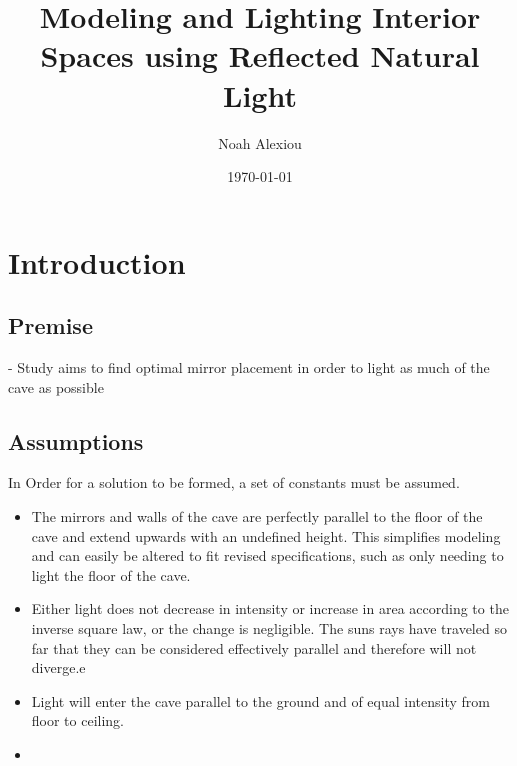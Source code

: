 \documentclass[11pt, letterpaper]{article}
\begin{document}
\title{Modeling and Lighting Interior Spaces using Reflected Natural Light}
\author{Noah Alexiou}
\date{\today}
\maketitle
\newpage
\tableofcontents
\newpage


\section{Introduction}


\subsection{Premise}
- Study aims to find optimal mirror placement in order to light as much of the cave as possible




\subsection{Assumptions}
\par
In Order for a solution to be formed, a set of constants must be assumed.
\begin{itemize}
	\item The mirrors and walls of the cave are perfectly parallel to the floor of the cave and extend upwards with an undefined height. This simplifies modeling and can easily be altered to fit revised specifications, such as only needing to light the floor of the cave.
	
	\item Either light does not decrease in intensity or increase in area according to the inverse square law, or the change is negligible. The suns rays have traveled so far that they can be considered effectively parallel and therefore will not diverge.e 
		
	\item Light will enter the cave parallel to the ground and of equal intensity from floor to ceiling.
	
	\item 
\end{itemize}
\end{document}

